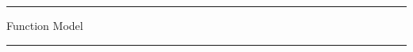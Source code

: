 \documentclass[a4paper]{article}
\begin{document}
  \thispagestyle{empty}
  \begin{center}
    {\rule{\textwidth}{0.2em}}
    {\Huge\yahei
    {Function Model}}
    {\rule{\textwidth}{0.2em}}
  \end{center}
\end{document}
